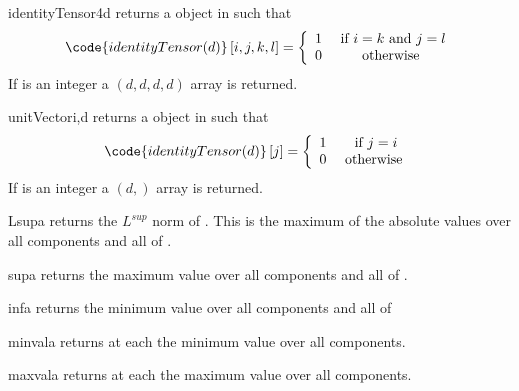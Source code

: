 \begin{funcdesc}{identityTensor4}{d}
returns a \RankFour \Data object in \FunctionSpace {} such that
\begin{equation}
\code{identityTensor(d)}\left[ i,j,k,l\right] = \left\{ 
\begin{array}{cc}
1 & \mbox{ if } i=k \mbox{ and } j=l\\
0 & \mbox{ otherwise }
\end{array}
\right.
\end{equation}
If  is an integer a $(d,d,d,d)$ \numpy array is returned.
\end{funcdesc}
\begin{funcdesc}{unitVector}{i,d}
returns a \RankOne \Data object in \FunctionSpace {} such that
\begin{equation}
\code{identityTensor(d)}\left[ j \right] = \left\{ 
\begin{array}{cc}
1 & \mbox{ if } j=i\\
0 & \mbox{ otherwise }
\end{array}
\right.
\end{equation}
If  is an integer a $(d,)$ \numpy array is returned.

\end{funcdesc}

\begin{funcdesc}{Lsup}{a}
returns the $L^{sup}$ norm of . This is the maximum of the absolute values
 over all components and all \DataSamplePoints of . 
\end{funcdesc}

\begin{funcdesc}{sup}{a}
returns the maximum value over all components and all \DataSamplePoints of .
\end{funcdesc}

\begin{funcdesc}{inf}{a}
returns the minimum value over all components and all \DataSamplePoints of 
\end{funcdesc}



\begin{funcdesc}{minval}{a}
returns at each \DataSamplePoints the minimum value over all components.
\end{funcdesc}

\begin{funcdesc}{maxval}{a}
returns at each \DataSamplePoints the maximum value over all components.
\end{funcdesc}

